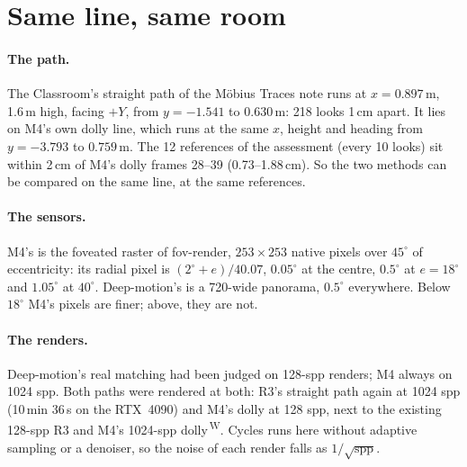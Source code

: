 \documentclass[11pt,a4paper]{article}
\newcommand{\src}[1]{\textsuperscript{\,#1}}
\newcommand{\WS}{\src{W}}   %
\begin{document}
\section{Same line, same room}\label{sec:setup}

\paragraph{The path.} The Classroom's straight path of the M\"obius Traces note runs at $x=0.897$\,m, 1.6\,m high, facing $+Y$, from
$y=-1.541$ to $0.630$\,m: 218 looks 1\,cm apart. It lies on M4's own dolly line, which runs at the same $x$, height and
heading from $y=-3.793$ to $0.759$\,m. The 12 references of the assessment (every 10 looks) sit within 2\,cm of M4's dolly
frames 28--39 (0.73--1.88\,cm). So the two methods can be compared on the same line, at the same references.

\paragraph{The sensors.} M4's is the foveated raster of fov-render, $253\times253$ native pixels over $45^\circ$ of
eccentricity: its radial pixel is $(2^\circ+e)/40.07$, $0.05^\circ$ at the centre, $0.5^\circ$ at $e=18^\circ$ and
$1.05^\circ$ at $40^\circ$. Deep-motion's is a 720-wide panorama, $0.5^\circ$ everywhere. Below $18^\circ$ M4's pixels are
finer; above, they are not.

\paragraph{The renders.} Deep-motion's real matching had been judged on 128-spp renders; M4 always on 1024 spp. Both
paths were rendered at both: R3's straight path again at 1024 spp (10\,min 36\,s on the RTX~4090) and M4's dolly at
128 spp, next to the existing 128-spp R3 and M4's 1024-spp dolly\WS. Cycles runs here without adaptive sampling or a
denoiser, so the noise of each render falls as $1/\sqrt{\text{spp}}$.
\end{document}
